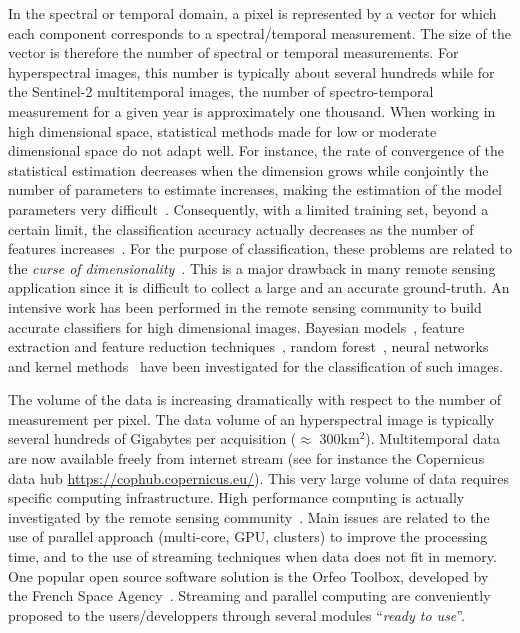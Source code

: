 \documentclass[journal,10pt]{IEEEtran}
\begin{document}
In the spectral or temporal domain, a pixel is represented by a vector
for   which  each   component  corresponds   to  a   spectral/temporal
measurement.   The size  of  the  vector is  therefore  the number  of
spectral  or temporal  measurements.  For  hyperspectral images,  this
number is  typically about several  hundreds while for  the Sentinel-2
multitemporal images, the number of spectro-temporal measurement for a
given  year  is approximately  one  thousand.   When working  in  high
dimensional  space,  statistical  methods  made for  low  or  moderate
dimensional  space do  not  adapt  well.  For  instance,  the rate  of
convergence of the statistical estimation decreases when the dimension
grows while conjointly the number of parameters to estimate increases,
making    the    estimation    of   the    model    parameters    very
difficult~\cite{donoho}.  Consequently,  with a limited  training set,
beyond a certain limit, the classification accuracy actually decreases
as the number of features increases~\cite{hughes}.  For the purpose of
classification,  these  problems are  related  to  the \emph{curse  of
  dimensionality}~\cite{donoho}.  This is  a  major  drawback in  many
remote sensing  application since it  is difficult to collect  a large
and an accurate ground-truth.  An intensive work has been performed in
the remote  sensing community to  build accurate classifiers  for high
dimensional  images.   Bayesian models~\cite{book:landgrebe},  feature
extraction              and             feature              reduction
techniques~\cite{book:landgrebe,DR:guided:tour},                random
forest~\cite{1396322},   neural  networks~\cite{5411821}   and  kernel
methods~\cite{kernel:methods:rs}  have   been  investigated   for  the
classification of such images.

The volume of the data is  increasing dramatically with respect to the
number of measurement  per pixel. The data volume  of an hyperspectral
image  is  typically several  hundreds  of  Gigabytes per  acquisition
($\approx$  300km$^2$). Multitemporal  data are  now available  freely
from  internet  stream  (see  for instance  the  Copernicus  data  hub
\url{https://cophub.copernicus.eu/}).  This very  large volume of data
requires   specific   computing  infrastructure.    High   performance
computing   is   actually   investigated   by   the   remote   sensing
community~\cite{christophe2011remote,plaza2011high}.  Main  issues are
related to the use of parallel approach (multi-core, GPU, clusters) to
improve the  processing time, and  to the use of  streaming techniques
when data  does not fit in  memory.  One popular open  source software
solution  is  the Orfeo  Toolbox,  developed  by the  French  Space
Agency~\cite{christophe2008orfeo}.   Streaming and  parallel computing
are  conveniently proposed  to the  users/developpers through  several
modules ``\emph{ready to use}''.
\end{document}
